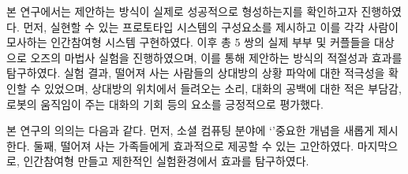 





본 연구에서는 제안하는 방식이 실제로  성공적으로 형성하는지를 확인하고자 \expUser\을 진행하였다. 먼저,  실현할 수 있는 프로토타입 시스템의 구성요소를 제시하고 이를 각각 사람이 모사하는 인간참여형 시스템  구현하였다. 이후 총 5 쌍의 실제 부부 및 커플들을 대상으로 오즈의 마법사 실험을 진행하였으며, 이를 통해 제안하는 방식의 적절성과 효과를 탐구하였다. 실험 결과, 떨어져 사는 사람들의 상대방의 상황 파악에 대한 적극성을 확인할 수 있었으며, 상대방의 위치에서 들려오는 소리, 대화의 공백에 대한 적은 부담감, 로봇의 움직임이 주는 대화의 기회 등의 요소를 긍정적으로 평가했다.



본 연구의 의의는 다음과 같다.
먼저, 소셜 컴퓨팅 분야에 `\concept' 중요한 개념을 새롭게 제시한다.
둘째, 떨어져 사는 가족들에게 \concept\을 효과적으로 제공할 수 있는 \approach\을 고안하였다.
마지막으로, 인간참여형 \sysname\를 만들고 제한적인 실험환경에서  효과를 탐구하였다.


